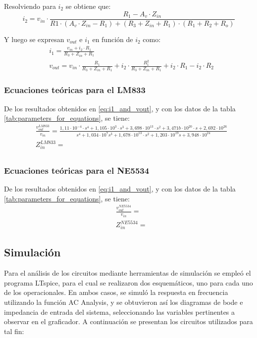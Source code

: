 Resolviendo para $i_2$ se obtiene que:
\begin{equation}
    i_2 = v_{in} \cdot \frac{R_1 - A_v \cdot Z_{in}}{R1 \cdot \left(A_v \cdot Z_{in} - R_1\right) + \left(R_3 + Z_{in} + R_1\right) \cdot \left(R_1 + R_2 + R_o\right)}
    \label{eq:i2}
\end{equation}

Y luego se expresan $v_{out}$ e $i_1$ en función de $i_2$ como:
\begin{align}
    \label{eq:i1_and_vout}
    &i_1 = \frac{v_{in} + i_2 \cdot R_1}{R_3 + Z_{in} + R_1} \\
    &v_{out} = v_{in} \cdot \frac{R_1}{R_3 + Z_{in} + R_1} + i_2 \cdot \frac{R_1^2}{R_3 + Z_{in} + R_1} + i_2 \cdot R_1 - i_2 \cdot R_2
\end{align}

\subsubsection{Ecuaciones teóricas para el LM833}
De los resultados obtenidos en \ref{eq:i1_and_vout}, y con los datos de la tabla \ref{tab:parameters_for_equations}, se tiene:
\begin{align}
    & \frac{v_{out}^{LM833}}{v_{in}} = \frac{1,11 \cdot 10^{-4} \cdot s^{4} + 1,105 \cdot 10^{3} \cdot s^{3} + 3,698 \cdot 10^{13} \cdot s^{2} + 3,471b\cdot 10^{20} \cdot s + 2,692 \cdot 10^{26}}
    {s^{4} + 1,034 \cdot 10^{7} s^{3} + 1,678 \cdot 10^{13} \cdot s^{2} + 1,203 \cdot 10^{19} s + 3,948 \cdot 10^{24}} \label{eq:LM833_transfer_fun} \\
    & Z_{in}^{LM833} = \label{eq:LM833_in_impedance} \\
\end{align}

\subsubsection{Ecuaciones teóricas para el NE5534}
De los resultados obtenidos en \ref{eq:i1_and_vout}, y con los datos de la tabla \ref{tab:parameters_for_equations}, se tiene:
\begin{align}
    & \frac{v_{out}^{NE5534}}{v_{in}} = \label{eq:NE5534_transfer_fun} \\
    & Z_{in}^{NE5534} = \label{eq:NE5534_in_impedance}
\end{align}


\subsection{Simulación}
Para el análisis de los circuitos mediante herramientas de simulación se empleó el programa LTspice, para el cual se realizaron dos esquemáticos, uno para cada uno de los operacionales.
En ambos casos, se simuló la respuesta en frecuencia utilizando la función AC Analysis, y se obtuvieron así los diagramas de bode e impedancia de entrada del sistema, seleccionando las variables pertinentes a observar en el graficador.
A continuación se presentan los circuitos utilizados para tal fin:
